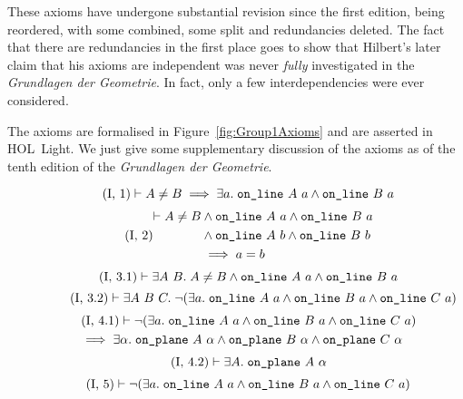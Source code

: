 These axioms have undergone substantial revision since the first edition, being reordered, with some combined, some split and redundancies deleted. The fact that there are redundancies in the first place goes to show that Hilbert's later claim that his axioms are independent was never \emph{fully} investigated in the \emph{Grundlagen der Geometrie}. In fact, only a few interdependencies were ever considered.

The axioms are formalised in Figure~\ref{fig:Group1Axioms} and are asserted in HOL~Light. We just give some supplementary discussion of the axioms as of the tenth edition of the \emph{Grundlagen der Geometrie}.

\begin{figure}
\begin{equation}\label{eq:g11}
  \tag{I,~1}
    \vdash A \neq B \implies \exists a.\; \texttt{on\_line}\ A\ a \wedge \texttt{on\_line}\ B\ a
\end{equation}
\begin{equation}\label{eq:g12}
  \tag{I,~2}
  \begin{split}
    \vdash A \neq B &\wedge \texttt{on\_line}\ A\ a \wedge \texttt{on\_line}\ B\ a\\
    &\wedge \texttt{on\_line}\ A\ b \wedge \texttt{on\_line}\ B\ b\\
    &\implies a = b
  \end{split}
\end{equation}
\begin{equation}\label{eq:g13a}
  \tag{I,~3.1}
  \vdash \exists A\ B.\; A \neq B \wedge \texttt{on\_line}\ A\ a \wedge \texttt{on\_line}\ B\ a
\end{equation}
\begin{equation}\label{eq:g13b}  \tag{I,~3.2}
  \vdash\exists A\ B\ C.\; \neg(\exists a.\; \texttt{on\_line}\ A\ a\wedge \texttt{on\_line}\ B\ a\wedge \texttt{on\_line}\ C\ a)
\end{equation}
\begin{multline}\label{eq:g14a}
  \tag{I,~4.1}
  \vdash\neg(\exists a.\; \texttt{on\_line}\ A\ a\wedge \texttt{on\_line}\ B\ a\wedge \texttt{on\_line}\ C\ a)\\\quad \implies \exists \alpha.\; \texttt{on\_plane}\ A\ \alpha \wedge \texttt{on\_plane}\ B\ \alpha \wedge \texttt{on\_plane}\ C\ \alpha
\end{multline}
\begin{equation}\label{eq:g14b}
  \tag{I,~4.2}
  \vdash\exists A.\; \texttt{on\_plane}\ A\ \alpha
\end{equation}
\begin{equation}\label{eq:g15}
  \tag{I,~5}
  \begin{split}
    &\vdash\Triangle{a}{A}{B}{C}\\

\end{split}
\end{equation}
\end{figure}
